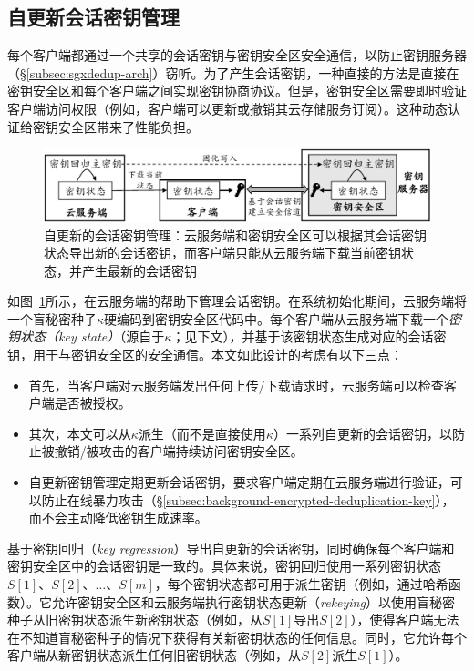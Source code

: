 \subsection{自更新会话密钥管理}
\label{subsec:sgxdedup-key-management}

每个客户端都通过一个共享的会话密钥与密钥安全区安全通信，以防止密钥服务器 （\S\ref{subsec:sgxdedup-arch}）窃听。为了产生会话密钥，一种直接的方法是直接在密钥安全区和每个客户端之间实现密钥协商协议。但是，密钥安全区需要即时验证客户端访问权限（例如，客户端可以更新或撤销其云存储服务订阅）。这种动态认证给密钥安全区带来了性能负担。

\begin{figure}[!htb]
\centering
\includegraphics[width=\textwidth]{pic/sgxdedup/keyRegression.pdf}
\caption{自更新的会话密钥管理：云服务端和密钥安全区可以根据其会话密钥状态导出新的会话密钥，而客户端只能从云服务端下载当前密钥状态，并产生最新的会话密钥}
\label{fig:sgxdedup-keymanage}
\end{figure}

如图~\ref{fig:sgxdedup-keymanage}所示，\sysnameS 在云服务端的帮助下管理会话密钥。在系统初始化期间，云服务端将一个盲秘密种子$\kappa$硬编码到密钥安全区代码中。每个客户端从云服务端下载一个\textit{密钥状态（key state）}（源自于$\kappa$；见下文），并基于该密钥状态生成对应的会话密钥，用于与密钥安全区的安全通信。本文如此设计的考虑有以下三点：
\begin{itemize}
    \item 首先，当客户端对云服务端发出任何上传/下载请求时，云服务端可以检查客户端是否被授权。
    \item 其次，本文可以从$\kappa$派生（而不是直接使用$\kappa$）一系列自更新的会话密钥，以防止被撤销/被攻击的客户端持续访问密钥安全区。
    \item 自更新密钥管理定期更新会话密钥，要求客户端定期在云服务端进行验证，可以防止在线暴力攻击（\S\ref{subsec:background-encrypted-deduplication-key}），而不会主动降低密钥生成速率\cite{bellare2013DupLESS}。
\end{itemize}

\sysnameS 基于密钥回归（\textit{key regression}）\cite{fu06}导出自更新的会话密钥，同时确保每个客户端和密钥安全区中的会话密钥是一致的。具体来说，密钥回归使用一系列密钥状态$S[1]、S[2]、\ldots、S[m]$，每个密钥状态都可用于派生密钥（例如，通过哈希函数）。它允许密钥安全区和云服务端执行密钥状态更新（\textit{rekeying}）以使用盲秘密种子从旧密钥状态派生新密钥状态（例如，从$S[1]$导出$S[2]$），使得客户端无法在不知道盲秘密种子的情况下获得有关新密钥状态的任何信息。同时，它允许每个客户端从新密钥状态派生任何旧密钥状态（例如，从$S[2]$派生$S[1]$）。

